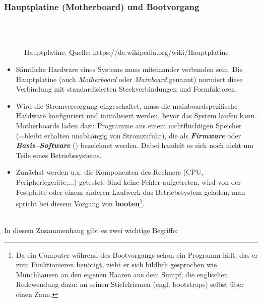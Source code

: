 \subsubsection{Hauptplatine (Motherboard) und Bootvorgang}
	\begin{figure}[h!]
		\centering
		~\\~\\
		\caption[Hauptplatine]{Hauptplatine. Quelle: https://de.wikipedia.org/wiki/Hauptplatine}
	\end{figure}
	\begin{itemize}
		\item Sämtliche Hardware eines Systems muss miteinander verbunden sein. Die Hauptplatine (auch \textit{Motherboard} oder \textit{Mainboard} genannt) normiert diese Verbindung mit standardisierten Steckverbindungen und Formfaktoren. 
		\item Wird die Stromversorgung eingeschaltet, muss die mainboardspezifische Hardware konfiguriert und initialisiert werden, bevor das System laufen kann. Motherboards laden dazu Programme aus einem nichtflüchtigen Speicher (=bleibt erhalten unabhängig von Stromzufuhr), die als \textbf{\textit{Firmware}} oder \textbf{\textit{Basis--Software}} (\cite[2.1]{gumm2}) bezeichnet werden. Dabei handelt es sich noch nicht um Teile eines Betriebssystems.
		\item Zunächst werden u.a. die Komponenten des Rechners (CPU, Peripheriegeräte,...) getestet. Sind keine Fehler aufgetreten, wird von der Festplatte oder einem anderen Laufwerk das Betriebssystem geladen; man spricht bei diesem Vorgang von \textbf{booten}\footnote{Da ein Computer während des Bootvorgangs schon ein Programm lädt, das er zum Funktionieren benötigt, zieht er sich bildlich gesprochen wie Münchhausen an den eigenen Haaren aus dem Sumpf; die englischen Redewendung dazu: an seinen Stiefelriemen (engl. bootstraps) selbst über einen Zaun.}.
	\end{itemize}
%
~\\
In diesem Zusammenhang gibt es zwei wichtige Begriffe:
